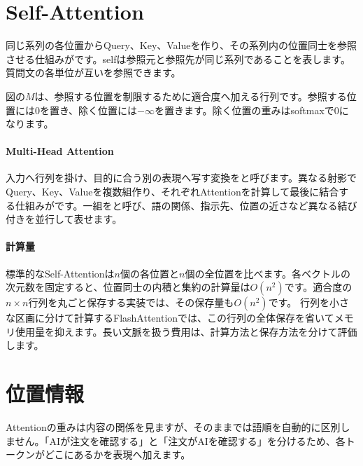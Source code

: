\section{Self-Attention}
\label{sec:06-machine-learning-24}

同じ系列の各位置からQuery、Key、Valueを作り、その系列内の位置同士を参照させる仕組みがです。selfは参照元と参照先が同じ系列であることを表します。質問文の各単位が互いを参照できます。

図の$M$は、参照する位置を制限するために適合度へ加える行列です。参照する位置には0を置き、除く位置には$-\infty$を置きます。除く位置の重みはsoftmaxで0になります。

\begingroup
  \centering
  \vspace{4mm}
\begingroup
\paragraph{Multi-Head Attention}
        入力へ行列を掛け、目的に合う別の表現へ写す変換をと呼びます。異なる射影でQuery、Key、Valueを複数組作り、それぞれAttentionを計算して最後に結合する仕組みがです。一組をと呼び、語の関係、指示先、位置の近さなど異なる結び付きを並行して表せます。

\par
\endgroup
\medskip
\begingroup
\paragraph{計算量}
        標準的なSelf-Attentionは$n$個の各位置と$n$個の全位置を比べます。各ベクトルの次元数を固定すると、位置同士の内積と集約の計算量は$O(n^2)$です。適合度の$n\times n$行列を丸ごと保存する実装では、その保存量も$O(n^2)$です。
        行列を小さな区画に分けて計算するFlashAttentionでは、この行列の全体保存を省いてメモリ使用量を抑えます。長い文脈を扱う費用は、計算方法と保存方法を分けて評価します。

\par
\endgroup
\par
\endgroup


\section{位置情報}
\label{sec:06-machine-learning-25}

Attentionの重みは内容の関係を見ますが、そのままでは語順を自動的に区別しません。「AIが注文を確認する」と「注文がAIを確認する」を分けるため、各トークンがどこにあるかを表現へ加えます。

